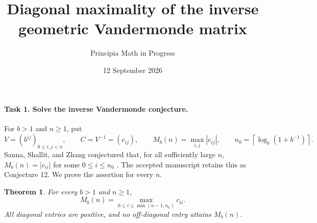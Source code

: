 \documentclass[10pt]{article}
\title{Diagonal maximality of the inverse geometric Vandermonde matrix}
\author{Principia Math in Progress}
\date{12 September 2026}
\newtheorem{theorem}{Theorem}
\begin{document}
\maketitle
\paragraph{Task 1. Solve the inverse Vandermonde conjecture.}
For \(b>1\) and \(n\ge1\), put
\[
 V=(b^{ij})_{0\le i,j<n},\qquad C=V^{-1}=(c_{ij}),\qquad
 M_b(n)=\max_{i,j}|c_{ij}|,\qquad
 n_0=\left\lceil\log_b(1+b^{-1})\right\rceil.
\]
Sanna, Shallit, and Zhang conjectured that, for all sufficiently large \(n\),
\(M_b(n)=|c_{ii}|\) for some \(0\le i\le n_0\)
\cite[Conjecture 11]{SSZ}. The accepted manuscript retains this as
Conjecture 12. We prove the assertion for every \(n\).

\begin{theorem}
For every \(b>1\) and \(n\ge1\),
\[
 M_b(n)=\max_{0\le i\le\min(n-1,n_0)}c_{ii}.
\]
All diagonal entries are positive, and no off-diagonal entry attains \(M_b(n)\).
\end{theorem}
\end{document}
